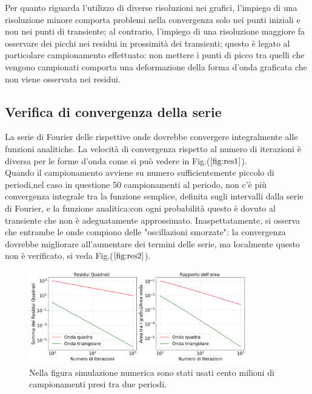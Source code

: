 \documentclass{article}
\begin{document}
        \noindent Per quanto riguarda l'utilizzo di diverse risoluzioni nei grafici, l'impiego di una risoluzione 
        minore comporta problemi nella convergenza solo nei punti iniziali
         e non nei punti di transiente; al contrario, l'impiego di una risoluzione 
        maggiore fa osservare dei picchi nei residui in prossimità dei transienti;
        questo è legato al particolare campionamento effettuato: 
        non mettere i punti di picco tra quelli che vengono campionati 
        comporta una deformazione della forma d'onda graficata che non viene osservata 
        nei residui.




    \subsection{Verifica di convergenza della serie}
    \label{sez:residui}
       
        La serie di Fourier delle rispettive onde dovrebbe convergere integralmente alle funzioni analitiche.
        La velocità di convergenza rispetto al numero 
        di iterazioni è diversa per le forme d'onda come si può vedere 
        in Fig.($\ref{fig:res1}$).\\ 
        Quando il campionamento avviene su numero sufficientemente
        piccolo di periodi,nel caso in questione 50 campionamenti al periodo,
          non c'è più convergenza integrale tra la funzione semplice, definita sugli 
        intervalli dalla serie di Fourier, e la funzione analitica:con ogni
        probabilità questo è dovuto al transiente che non è adeguatamente approssimato.
        Inaspettatamente, si osserva che entrambe le onde compiono delle "oscillazioni smorzate":
        la convergenza dovrebbe migliorare all'aumentare dei termini delle serie,
        ma localmente questo non è verificato, si veda Fig.($\ref{fig:res2}$).
        

        \begin{figure}[H]
            \centering
            \includegraphics[width=0.85\textwidth]{residuals1.png} %
            \caption{Nella figura simulazione numerica sono stati usati cento milioni di campionamenti presi tra due periodi.}
            \label{fig:res1}
        \end{figure}
\end{document}
